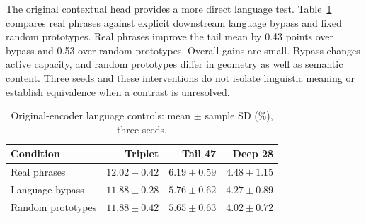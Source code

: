 \documentclass[11pt,letterpaper]{article}
\begin{document}
The original contextual head provides a more direct language test. Table~\ref{tab:language-controls} compares real phrases against explicit downstream language bypass and fixed random prototypes. Real phrases improve the tail mean by 0.43 points over bypass and 0.53 over random prototypes. Overall gains are small. Bypass changes active capacity, and random prototypes differ in geometry as well as semantic content. Three seeds and these interventions do not isolate linguistic meaning or establish equivalence when a contrast is unresolved.
\begin{table}[htbp]
\centering
\caption{Original-encoder language controls: mean $\pm$ sample SD (\%), three seeds.}
\label{tab:language-controls}
\begin{singlespace}
\begin{tabularx}{\textwidth}{@{}Xrrr@{}}
\toprule
\textbf{Condition} & \textbf{Triplet} & \textbf{Tail 47} & \textbf{Deep 28} \\
\midrule
Real phrases & $12.02\pm0.42$ & $6.19\pm0.59$ & $4.48\pm1.15$ \\
Language bypass & $11.88\pm0.28$ & $5.76\pm0.62$ & $4.27\pm0.89$ \\
Random prototypes & $11.88\pm0.42$ & $5.65\pm0.63$ & $4.02\pm0.72$ \\
\bottomrule
\end{tabularx}
\end{singlespace}
\end{table}
\end{document}
